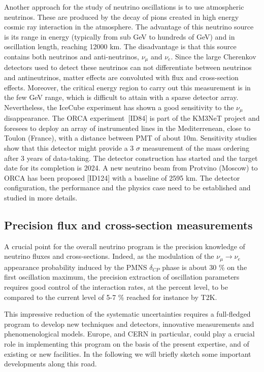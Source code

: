 Another approach for the study of neutrino oscillations is to use atmospheric neutrinos. These are produced by the decay of pions created in high energy cosmic ray interaction in the atmosphere. The advantage of this neutrino source is its range in energy (typically from sub GeV to hundreds of GeV) and in oscillation length, reaching 12000 km.
The disadvantage is that this source contains both neutrinos and anti-neutrinos, $\nu_\mu$ and $\nu_e$. Since the large Cherenkov detectors used to detect these neutrinos can not differentiate between neutrinos and antineutrinos, matter effects are convoluted with flux and cross-section effects. 
Moreover, the critical energy region to carry out this measurement is in the few GeV range, which is difficult to attain with a sparse detector array. Nevertheless, the IceCube experiment has shown a good sensitivity to the $\nu_\mu$ disappearance. The ORCA experiment~[ID84] %
 is part of the KM3NeT project and foresees to deploy an array of instrumented lines in the Mediterrenean, close to Toulon (France), with a distance between PMT of about 10m. Sensitivity studies show that this detector might provide a 3 $\sigma$ measurement of the mass ordering after 3 years of data-taking. The detector construction has started and the target date for its completion is 2024. A new neutrino beam from Protvino (Moscow) to ORCA has been proposed [ID124] with a baseline of 2595 km. The detector configuration, the performance and the physics case need to be established and studied in more details.


\subsection{ Precision flux and cross-section measurements}


A crucial point for the overall neutrino program is the precision knowledge of neutrino fluxes and cross-sections. Indeed, as the modulation of the $\nu_\mu \rightarrow \nu_e$ appearance probability induced by the PMNS $\delta_{CP}$ phase is about 30 \% on the first oscillation maximum, the precision extraction of oscillation parameters requires good control of the interaction rates, at the percent level, to be compared to the current level of 5-7 \% reached for instance by T2K.

This impressive reduction of the systematic uncertainties requires a full-fledged program to develop new techniques and detectors, innovative measurements and phenomenological models. Europe, and CERN in particular, could play a crucial role in implementing this program on the basis of the present expertise, and of existing or new facilities.
In the following we will briefly sketch some important developments along this road.


